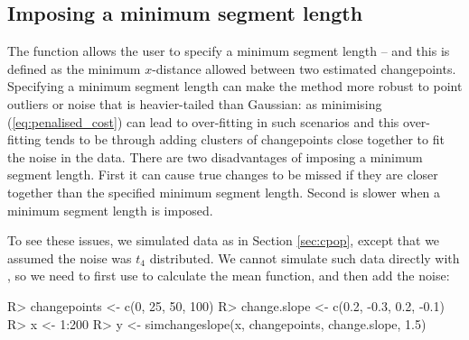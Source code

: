 \documentclass[article]{jss}
\begin{document}
\subsection{Imposing a minimum segment length}

The  function allows the user to specify a minimum segment length -- and this is defined as the minimum $x$-distance allowed between two estimated changepoints. Specifying a minimum segment length can make the method more robust to point outliers or noise that is heavier-tailed than Gaussian: as minimising (\ref{eq:penalised_cost}) can lead to over-fitting in such scenarios and this over-fitting tends to be through adding clusters of changepoints close together to fit the noise in the data. There are two disadvantages of imposing a minimum segment length. First it can cause true changes to be missed if they are closer together than the specified minimum segment length. Second  is slower when a minimum segment length is imposed.

To see these issues, we simulated data as in Section \ref{sec:cpop}, except that we assumed the noise was $t_4$ distributed. We cannot simulate such data directly with , so we need to first use  to calculate the mean function, and then add the noise:

\begin{CodeChunk}
\begin{CodeInput}
R> changepoints <- c(0, 25, 50, 100)
R> change.slope <- c(0.2, -0.3, 0.2, -0.1)
R> x <- 1:200
R> y <- simchangeslope(x, changepoints, change.slope, 1.5) 
\end{CodeInput}
\end{CodeChunk}
\end{document}
